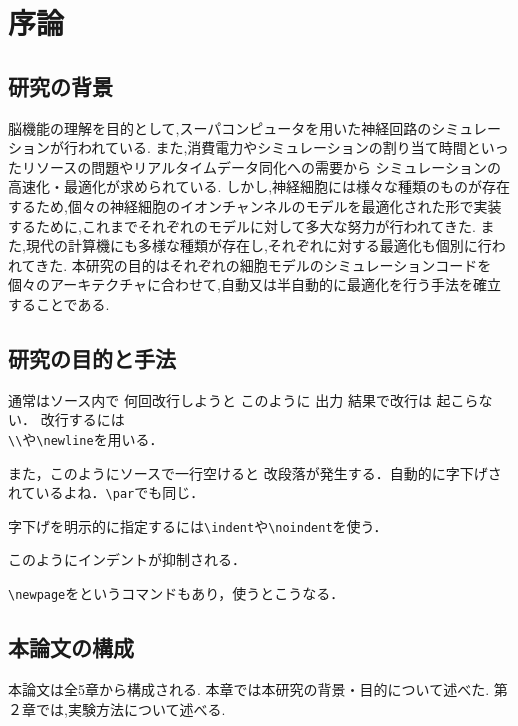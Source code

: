 \section{序論}
\subsection{研究の背景}
脳機能の理解を目的として,スーパコンピュータを用いた神経回路のシミュレーションが行われている. また,消費電力やシミュレーションの割り当て時間といったリソースの問題やリアルタイムデータ同化への需要から
シミュレーションの高速化・最適化が求められている. しかし,神経細胞には様々な種類のものが存在するため,個々の神経細胞のイオンチャンネルのモデルを最適化された形で実装するために,これまでそれぞれのモデルに対して多大な努力が行われてきた.
また,現代の計算機にも多様な種類が存在し,それぞれに対する最適化も個別に行われてきた.
本研究の目的はそれぞれの細胞モデルのシミュレーションコードを個々のアーキテクチャに合わせて,自動又は半自動的に最適化を行う手法を確立することである.

\subsection{研究の目的と手法}
通常はソース内で
何回改行しようと
このように
出力
結果で改行は
起こらない．
改行するには\\
\verb+\+\verb+\+や\verb+\newline+を用いる．

また，このようにソースで一行空けると
改段落が発生する．自動的に字下げされているよね．\verb+\par+でも同じ．\par
字下げを明示的に指定するには\verb+\indent+や\verb+\noindent+を使う．

\noindent このようにインデントが抑制される．

\verb+\newpage+をというコマンドもあり，使うと{\newpage}こうなる．

\subsection{本論文の構成}
本論文は全5章から構成される.
本章では本研究の背景・目的について述べた.
第２章では,実験方法について述べる.
